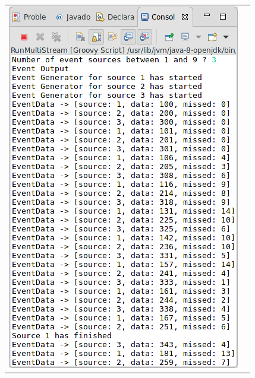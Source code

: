 \begin{tabular}{c|c}

	\includegraphics[width=\textwidth/2]{img/screenshots/9-3-1-1.png} &

\end{tabular}
